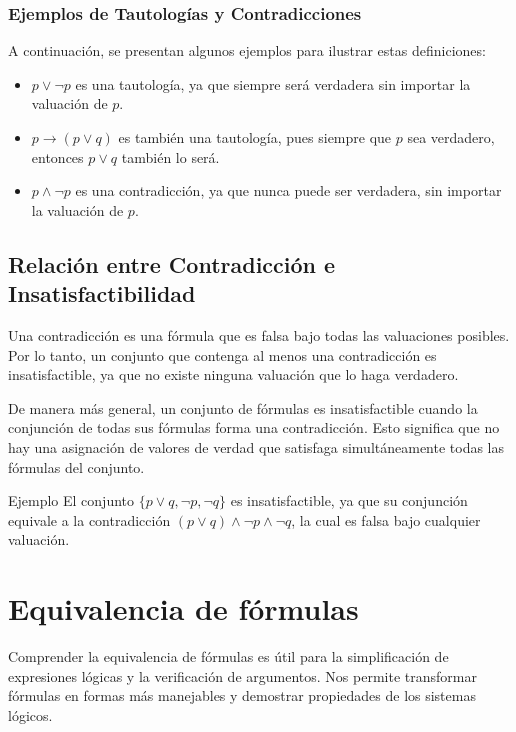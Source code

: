 \subsubsection*{Ejemplos de Tautologías y Contradicciones}

A continuación, se presentan algunos ejemplos para ilustrar estas definiciones:


  \begin{itemize}
    \item \( p \lor \lnot p \) es una tautología, ya que siempre será verdadera sin importar la valuación de \( p \).
    \item \( p \rightarrow (p \lor q) \) es también una tautología, pues siempre que \( p \) sea verdadero, entonces $p \lor q$ también lo será.
    \item \( p \land \lnot p \) es una contradicción, ya que nunca puede ser verdadera, sin importar la valuación de \( p \).
  \end{itemize}


\subsection{Relación entre Contradicción e Insatisfactibilidad}

Una contradicción es una fórmula que es falsa bajo todas las valuaciones posibles. Por lo tanto, un conjunto que contenga al menos una contradicción es insatisfactible, ya que no existe ninguna valuación que lo haga verdadero.

De manera más general, un conjunto de fórmulas es insatisfactible cuando la conjunción de todas sus fórmulas forma una contradicción. Esto significa que no hay una asignación de valores de verdad que satisfaga simultáneamente todas las fórmulas del conjunto.

\begin{exampleblock}{Ejemplo} 
  El conjunto \( \{p \lor q, \lnot p, \lnot q\} \) es insatisfactible, ya que su conjunción equivale a la contradicción \( (p \lor q) \land \lnot p \land \lnot q \), la cual es falsa bajo cualquier valuación.
\end{exampleblock}


\section{Equivalencia de fórmulas}

Comprender la equivalencia de fórmulas es útil para la simplificación de expresiones lógicas y la verificación de argumentos. Nos permite transformar fórmulas en formas más manejables y demostrar propiedades de los sistemas lógicos.


